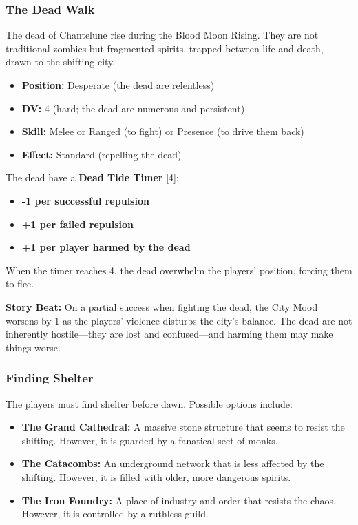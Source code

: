 \documentclass{article}
\begin{document}
\subsubsection{The Dead Walk}

The dead of Chantelune rise during the Blood Moon Rising. They are not traditional zombies but fragmented spirits, trapped between life and death, drawn to the shifting city.

\begin{itemize}
    \item \textbf{Position:} Desperate (the dead are relentless)
    \item \textbf{DV:} 4 (hard; the dead are numerous and persistent)
    \item \textbf{Skill:} Melee or Ranged (to fight) or Presence (to drive them back)
    \item \textbf{Effect:} Standard (repelling the dead)
\end{itemize}

The dead have a \textbf{Dead Tide Timer } [4]:

\begin{itemize}
    \item \textbf{-1 per successful repulsion}
    \item \textbf{+1 per failed repulsion}
    \item \textbf{+1 per player harmed by the dead}
\end{itemize}

When the timer reaches 4, the dead overwhelm the players' position, forcing them to flee.

\begin{storybox}
\textbf{Story Beat:} On a partial success when fighting the dead, the City Mood worsens by 1 as the players' violence disturbs the city's balance. The dead are not inherently hostile---they are lost and confused---and harming them may make things worse.
\end{storybox}

\subsubsection{Finding Shelter}

The players must find shelter before dawn. Possible options include:

\begin{itemize}
    \item \textbf{The Grand Cathedral:} A massive stone structure that seems to resist the shifting. However, it is guarded by a fanatical sect of monks.
    \item \textbf{The Catacombs:} An underground network that is less affected by the shifting. However, it is filled with older, more dangerous spirits.
    \item \textbf{The Iron Foundry:} A place of industry and order that resists the chaos. However, it is controlled by a ruthless guild.
\end{itemize}
\end{document}
